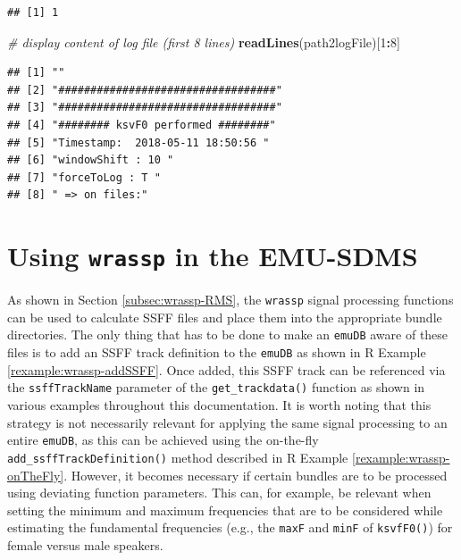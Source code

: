 \documentclass[]{book}
\newenvironment{Shaded}{\begin{snugshade}}{\end{snugshade}}
\newcommand{\CommentTok}[1]{\textcolor[rgb]{0.56,0.35,0.01}{\textit{#1}}}
\newcommand{\DecValTok}[1]{\textcolor[rgb]{0.00,0.00,0.81}{#1}}
\newcommand{\KeywordTok}[1]{\textcolor[rgb]{0.13,0.29,0.53}{\textbf{#1}}}
\newcommand{\NormalTok}[1]{#1}
\newcommand{\OperatorTok}[1]{\textcolor[rgb]{0.81,0.36,0.00}{\textbf{#1}}}
\theoremstyle{definition}
\theoremstyle{definition}
\theoremstyle{definition}
\theoremstyle{remark}
\begin{document}
\begin{verbatim}
## [1] 1
\end{verbatim}

\begin{Shaded}
\begin{Highlighting}[]
\CommentTok{# display content of log file (first 8 lines)}
\KeywordTok{readLines}\NormalTok{(path2logFile)[}\DecValTok{1}\OperatorTok{:}\DecValTok{8}\NormalTok{]}
\end{Highlighting}
\end{Shaded}

\begin{verbatim}
## [1] ""                                  
## [2] "##################################"
## [3] "##################################"
## [4] "######## ksvF0 performed ########" 
## [5] "Timestamp:  2018-05-11 18:50:56 "  
## [6] "windowShift : 10 "                 
## [7] "forceToLog : T "                   
## [8] " => on files:"
\end{verbatim}

\hypertarget{sec:wrassp_emu-sdms}{%
\section{\texorpdfstring{Using \texttt{wrassp} in the
EMU-SDMS}{Using wrassp in the EMU-SDMS}}\label{sec:wrassp_emu-sdms}}

As shown in Section \ref{subsec:wrassp-RMS}, the \texttt{wrassp} signal
processing functions can be used to calculate SSFF files and place them
into the appropriate bundle directories. The only thing that has to be
done to make an \texttt{emuDB} aware of these files is to add an SSFF
track definition to the \texttt{emuDB} as shown in R Example
\ref{rexample:wrassp-addSSFF}. Once added, this SSFF track can be
referenced via the \texttt{ssffTrackName} parameter of the
\texttt{get\_trackdata()} function as shown in various examples
throughout this documentation. It is worth noting that this strategy is
not necessarily relevant for applying the same signal processing to an
entire \texttt{emuDB}, as this can be achieved using the on-the-fly
\texttt{add\_ssffTrackDefinition()} method described in R Example
\ref{rexample:wrassp-onTheFly}. However, it becomes necessary if certain
bundles are to be processed using deviating function parameters. This
can, for example, be relevant when setting the minimum and maximum
frequencies that are to be considered while estimating the fundamental
frequencies (e.g., the \texttt{maxF} and \texttt{minF} of
\texttt{ksvfF0()}) for female versus male speakers.
\end{document}
